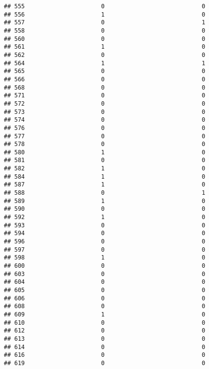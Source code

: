 \documentclass[
]{article}
\begin{document}
\begin{verbatim}
## 555                      0                            0
## 556                      1                            0
## 557                      0                            1
## 558                      0                            0
## 560                      0                            0
## 561                      1                            0
## 562                      0                            0
## 564                      1                            1
## 565                      0                            0
## 566                      0                            0
## 568                      0                            0
## 571                      0                            0
## 572                      0                            0
## 573                      0                            0
## 574                      0                            0
## 576                      0                            0
## 577                      0                            0
## 578                      0                            0
## 580                      1                            0
## 581                      0                            0
## 582                      1                            0
## 584                      1                            0
## 587                      1                            0
## 588                      0                            1
## 589                      1                            0
## 590                      0                            0
## 592                      1                            0
## 593                      0                            0
## 594                      0                            0
## 596                      0                            0
## 597                      0                            0
## 598                      1                            0
## 600                      0                            0
## 603                      0                            0
## 604                      0                            0
## 605                      0                            0
## 606                      0                            0
## 608                      0                            0
## 609                      1                            0
## 610                      0                            0
## 612                      0                            0
## 613                      0                            0
## 614                      0                            0
## 616                      0                            0
## 619                      0                            0

\end{verbatim}
\end{document}

